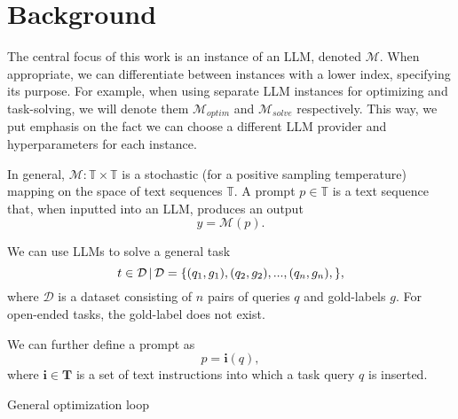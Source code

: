 \section{Background}
The central focus of this work is an instance of an LLM, denoted $\mathcal{M}$. 
When appropriate, we can differentiate between instances with a lower index, specifying its purpose. 
For example, when using separate LLM instances for optimizing and task-solving, we will denote them $\mathcal{M}_{optim}$ and $\mathcal{M}_{solve}$ respectively.
This way, we put emphasis on the fact we can choose a different LLM provider and hyperparameters for each instance.


In general, $\mathcal{M}: \mathbb{T} \times \mathbb{T}$ is a stochastic (for a positive sampling temperature) mapping on the space of text sequences $\mathbb{T}$.
A prompt $p \in \mathbb{T}$ is a text sequence that, when inputted into an LLM, produces an output
\begin{equation}
    y = \mathcal{M}(p).
\end{equation} 

We can use LLMs to solve a general task
\begin{equation}
    t \in \mathcal{D} \, \vert \, \mathcal{D} = \{ (q_1, g_1), (q_2, g_2), ... , (q_n, g_n), \},
\end{equation}
where $\mathcal{D}$ is a dataset consisting of $n$ pairs of queries $q$ and gold-labels $g$. 
For open-ended tasks, the gold-label does not exist.


We can further define a prompt as
\begin{equation}
    p = \mathbf{i}(q),
\end{equation}
where $\mathbf{i} \in \mathbf{T}$ is a set of text instructions into which a task query $q$ is inserted. 

\begin{algorithm}
    \caption{General optimization loop}
    \label{alg:genoptimloop}
     
         
    \end{algorithm}
    
